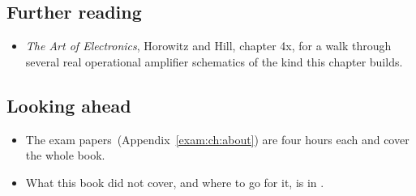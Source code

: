 \subsection*{Further reading}
\begin{itemize}
  \item \emph{The Art of Electronics}, Horowitz and Hill, chapter 4x, for a walk through several real operational amplifier schematics of the kind this chapter builds.
\end{itemize}

\subsection*{Looking ahead}
\begin{itemize}
  \item The exam papers~(Appendix~\ref{exam:ch:about}) are four hours each and cover the whole book.
  \item What this book did not cover, and where to go for it, is in .
\end{itemize}
